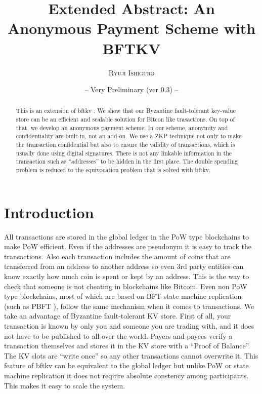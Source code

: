 \documentclass[10pt,fleqn]{article}
\title{Extended Abstract: An Anonymous Payment Scheme with BFTKV}
\author{%
  \textsc{Ryuji Ishiguro}\\%
}
\date{{\small -- Very Preliminary (ver 0.3) --}}
\begin{document}
\maketitle

\begin{abstract}

This is an extension of \textsf{bftkv} \cite{bftkv}. We show that our Byzantine fault-tolerant key-value store can be an efficient and scalable solution for Bitcon like trasactions. On top of that, we develop an anonymous payment scheme. In our scheme, anonymity and confidentiality are built-in, not an add-on. We use a ZKP technique not only to make the transaction confidential but also to ensure the validity of transactions, which is usually done using digital signatures. There is not any linkable information in the transaction such as ``addresses'' to be hidden in the first place. The double spending problem is reduced to the equivocation problem that is solved with \textsf{bftkv}.

\end{abstract}

\section{Introduction}
All transactions are stored in the global ledger in the PoW type blockchains to make PoW efficient. Even if the addresses are pseudonym it is easy to track the transactions. Also each transaction includes the amount of coins that are transferred from an address to another address so even 3rd party entities can know exactly how much coin is spent or kept by an address. This is the way to check that someone is not cheating in blockchains like Bitcoin. Even non PoW type blockchains, most of which are based on BFT state machine replication (such as PBFT \cite{pbft}), follow the same mechanism when it comes to transactions. We take an advantage of Byzantine fault-tolerant KV store. First of all, your transaction is known by only you and someone you are trading with, and it does not have to be published to all over the world. Payers and payees verify a transaction themselves and stores it in the KV store with a ``Proof of Balance''. The KV slots are ``write once'' so any other transactions cannot overwrite it. This feature of \textsf{bftkv} can be equivalent to the global ledger but unlike PoW or state machine replication it does not require absolute constency among participants. This makes it easy to scale the system. 
\end{document}
